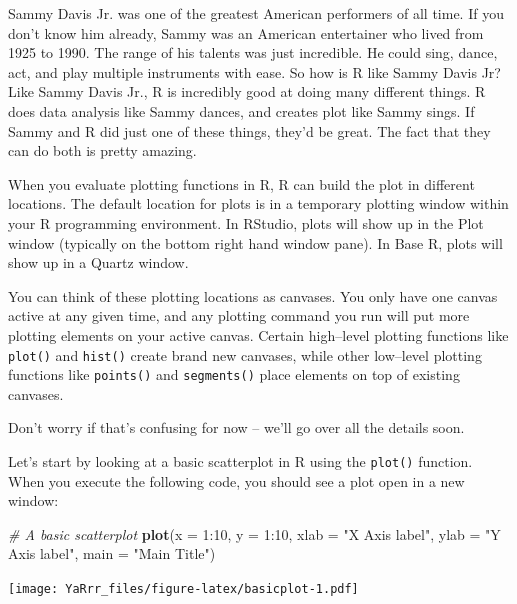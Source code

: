 \documentclass[]{book}
\newenvironment{Shaded}{\begin{snugshade}}{\end{snugshade}}
\newcommand{\KeywordTok}[1]{\textcolor[rgb]{0.13,0.29,0.53}{\textbf{{#1}}}}
\newcommand{\DataTypeTok}[1]{\textcolor[rgb]{0.13,0.29,0.53}{{#1}}}
\newcommand{\DecValTok}[1]{\textcolor[rgb]{0.00,0.00,0.81}{{#1}}}
\newcommand{\StringTok}[1]{\textcolor[rgb]{0.31,0.60,0.02}{{#1}}}
\newcommand{\CommentTok}[1]{\textcolor[rgb]{0.56,0.35,0.01}{\textit{{#1}}}}
\newcommand{\NormalTok}[1]{{#1}}
\theoremstyle{definition}
\theoremstyle{definition}
\theoremstyle{remark}
\begin{document}
Sammy Davis Jr. was one of the greatest American performers of all time.
If you don't know him already, Sammy was an American entertainer who
lived from 1925 to 1990. The range of his talents was just incredible.
He could sing, dance, act, and play multiple instruments with ease. So
how is R like Sammy Davis Jr? Like Sammy Davis Jr., R is incredibly good
at doing many different things. R does data analysis like Sammy dances,
and creates plot like Sammy sings. If Sammy and R did just one of these
things, they'd be great. The fact that they can do both is pretty
amazing.

When you evaluate plotting functions in R, R can build the plot in
different locations. The default location for plots is in a temporary
plotting window within your R programming environment. In RStudio, plots
will show up in the Plot window (typically on the bottom right hand
window pane). In Base R, plots will show up in a Quartz window.

You can think of these plotting locations as canvases. You only have one
canvas active at any given time, and any plotting command you run will
put more plotting elements on your active canvas. Certain high--level
plotting functions like \texttt{plot()} and \texttt{hist()} create brand
new canvases, while other low--level plotting functions like
\texttt{points()} and \texttt{segments()} place elements on top of
existing canvases.

Don't worry if that's confusing for now -- we'll go over all the details
soon.

Let's start by looking at a basic scatterplot in R using the
\texttt{plot()} function. When you execute the following code, you
should see a plot open in a new window:

\begin{Shaded}
\begin{Highlighting}[]
\CommentTok{# A basic scatterplot}
\KeywordTok{plot}\NormalTok{(}\DataTypeTok{x =} \DecValTok{1}\NormalTok{:}\DecValTok{10}\NormalTok{,}
     \DataTypeTok{y =} \DecValTok{1}\NormalTok{:}\DecValTok{10}\NormalTok{,}
     \DataTypeTok{xlab =} \StringTok{"X Axis label"}\NormalTok{,}
     \DataTypeTok{ylab =} \StringTok{"Y Axis label"}\NormalTok{,}
     \DataTypeTok{main =} \StringTok{"Main Title"}\NormalTok{)}
\end{Highlighting}
\end{Shaded}

\texttt{[image: YaRrr\_files/figure-latex/basicplot-1.pdf]}
\end{document}
